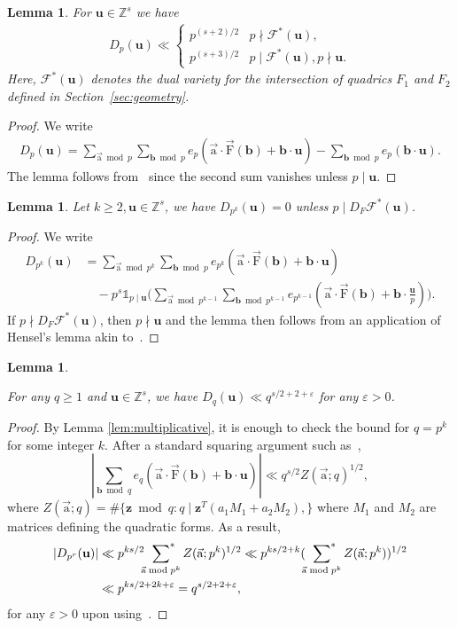 \documentclass[letterpaper,11pt]{amsart}
\numberwithin{equation}{section}
\newtheorem{lemma}[theorem]{Lemma}
\theoremstyle{definition}
\numberwithin{equation}{section}
\newcommand{\ZZ}{\mathbb{Z}}
\newcommand{\uu}{\mathbf{u}}
\newcommand{\bb}{\mathbf{b}}
\newcommand{\z}{\mathbf{z}}
\newcommand{\starsum}{\sideset{}{^*}\sum}
\newcommand{\ua}{\vec{\mathrm{a}}}
\newcommand{\uF}{{\vec{\mathrm{F}} }}
\def\scrF{{\mathcal F}}
\newcommand{\nF}{\uF}
\begin{document}
\begin{lemma}\label{lem:Dp bound}
For $\uu \in \ZZ^s$ we have
\begin{align*}
D_p(\uu)\ll \begin{cases}
p^{(s+2)/2} & p\nmid \scrF^*(\uu),\\
p^{(s+3)/2} & p\mid \scrF^*(\uu), p\nmid \uu.
\end{cases}
\end{align*}
Here, $\scrF^*(\uu)$ denotes the dual variety for the intersection of quadrics $F_1$ and $F_2$ defined in Section~\ref{sec:geometry}.
\end{lemma}
\begin{proof}
	We write 
    \begin{align*}D_p(\uu)=\sum_{\ua\bmod p}\sum_{\bb\bmod p}e_p(\ua \cdot \nF(\bb)+\bb\cdot \uu)-\sum_{\bb\bmod p}e_p(\bb\cdot \uu).\end{align*} 
    The lemma follows from~\cite[Lemma 19]{BM} since the second sum vanishes unless $p\mid \uu$. 
\end{proof}
\begin{lemma}\label{lem:Dpk bound}
	Let $k\geq 2, \uu \in \ZZ^s$, we have $D_{p^k}(\uu)=0$ unless $p\mid D_F\mathcal F^*(\uu)$.
\end{lemma}
\begin{proof}
	We write 
    \begin{align*}D_{p^k}(\uu)&=\sum_{\ua \bmod {p^{k}}}\sum_{\bb \bmod p}e_{p^k}(\ua \cdot \nF(\bb)+\bb\cdot \uu)\\
    & \quad -p^{s}\mathds 1_{p\mid \uu}\Big(\sum_{\ua \bmod {p^{k-1}}}\sum_{\bb \bmod p^{k-1}}e_{p^{k-1}}(\ua \cdot \nF(\bb)+\bb \cdot \frac{\uu}{p})\Big).\end{align*} 
    If $p\nmid D_F\mathcal F^*(\uu)$, then $p\nmid \uu$ and the lemma then follows from an application of Hensel's lemma akin to~\cite[Lemma 20]{BM}. 
\end{proof}
\begin{lemma}\label{lem:Dq-crude}

For any $q\geq 1$ and  $\uu \in \ZZ^s$, we have
	$D_q(\uu)\ll q^{s/2+2+\varepsilon}$ for any $\varepsilon >0$.
\end{lemma}
\begin{proof}
By Lemma \ref{lem:multiplicative}, it is enough to check the bound for $q=p^k$ for some integer $k$. After a standard squaring argument such as~\cite[Lemma 2.5]{V19},
\begin{equation*}
|\sum_{\bb \bmod q}e_{q}(\ua\cdot \uF(\bb)+\bb\cdot \uu)|\ll q^{s/2}Z(\ua;q)^{1/2},
\end{equation*}
where $Z(\ua;q)=\#\{\z\bmod q: q\mid \z^T (a_1M_1+a_2M_2),\}$
where $M_1$ and $M_2$ are matrices defining the quadratic forms. As a result,
\begin{align*}
|D_{p^r}(\uu)|&\ll p^{ks/2}\starsum_{\ua\bmod p^k}Z(\ua;p^k)^{1/2}\ll p^{ks/2+k}(\starsum_{\ua\bmod p^k}Z(\ua;p^k))^{1/2}\\ &\ll p^{ks/2+2k+\varepsilon}=q^{s/2+2+\varepsilon},
\end{align*}
for any $\varepsilon>0$
upon using~\cite[Lemma 5.4]{HBP}.
\end{proof}
\end{document}
